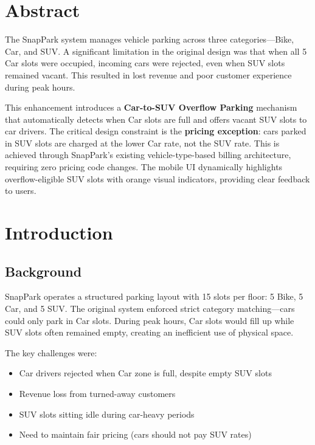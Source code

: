 \documentclass[12pt,a4paper]{article}
\begin{document}
\newpage
\section*{Abstract}

The SnapPark system manages vehicle parking across three categories---Bike, Car, and SUV. A significant limitation in the original design was that when all 5 Car slots were occupied, incoming cars were rejected, even when SUV slots remained vacant. This resulted in lost revenue and poor customer experience during peak hours.

This enhancement introduces a \textbf{Car-to-SUV Overflow Parking} mechanism that automatically detects when Car slots are full and offers vacant SUV slots to car drivers. The critical design constraint is the \textbf{pricing exception}: cars parked in SUV slots are charged at the lower Car rate, not the SUV rate. This is achieved through SnapPark's existing vehicle-type-based billing architecture, requiring zero pricing code changes. The mobile UI dynamically highlights overflow-eligible SUV slots with orange visual indicators, providing clear feedback to users.

\newpage
\tableofcontents
\newpage

\section{Introduction}

\subsection{Background}
SnapPark operates a structured parking layout with 15 slots per floor: 5 Bike, 5 Car, and 5 SUV. The original system enforced strict category matching---cars could only park in Car slots. During peak hours, Car slots would fill up while SUV slots often remained empty, creating an inefficient use of physical space.

The key challenges were:
\begin{itemize}[noitemsep]
    \item Car drivers rejected when Car zone is full, despite empty SUV slots
    \item Revenue loss from turned-away customers
    \item SUV slots sitting idle during car-heavy periods
    \item Need to maintain fair pricing (cars should not pay SUV rates)
\end{itemize}
\end{document}
